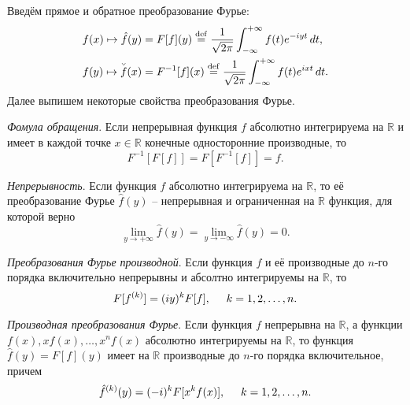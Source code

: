 Введём прямое и обратное преобразование Фурье:
\begin{align}
    f(x) \mapsto \hat{f}(y) &= F[f](y) \overset{\mathrm{def}}{=} \frac{1}{\sqrt{2\pi}} \int_{-\infty}^{+\infty} f(t) e^{-iyt} \d t, \\
    f(y) \mapsto \bhat{f}(x) &= F^{-1}[f](x) \overset{\mathrm{def}}{=} 
    \frac{1}{\sqrt{2\pi}} \int_{-\infty}^{+\infty} f(t) e^{i x t} \d t.
\end{align}
Далее выпишем некоторые свойства преобразования Фурье.

\textit{Фомула обращения}. Если непрерывная функция $f$ абсолютно интегрируема на $\mathbb{R}$ и имеет в каждой точке $x \in \mathbb{R}$ конечные односторонние производные, то
\begin{equation*}
    F^{-1} [F[f]] = F[F^{-1}[f]] = f.
\end{equation*}

\textit{Непрерывность}. Если функция $f$ абсолютно интегрируема на $\mathbb{R}$, то её преобразование Фурье $\hat{f}(y)$ -- непрерывная и ограниченная на $\mathbb{R}$ функция, для которой верно
\begin{equation*}
    \lim_{y \to + \infty} \hat{f} (y) = \lim_{y \to -\infty} \hat{f}(y) = 0.
\end{equation*}

\textit{Преобразования Фурье производной}. Если функция $f$ и её производные до $n$-го порядка включительно непрерывны и абсолтно интегрируемы на $\mathbb{R}$, то
\begin{equation*}
    F[f^{(k)}] = (iy)^k F[f], \hspace{5 mm} k =1, 2, \ldots, n.
\end{equation*}

\textit{Производная преобразования Фурье}. Если функция $f$ непрерывна на $\mathbb{R}$, а функции $f(x), x f(x), \ldots, x^n f(x)$ абсолютно интегрируемы на $\mathbb{R}$, то функция $\hat{f} (y) = F[f](y)$ имеет на $\mathbb{R}$ производные до $n$-го порядка включительное, причем
\begin{equation*}
    \hat{f}^{(k)} (y) = (-i)^k F[x^k f(x)], \hspace{5 mm} k = 1, 2, \ldots, n.
\end{equation*} 

